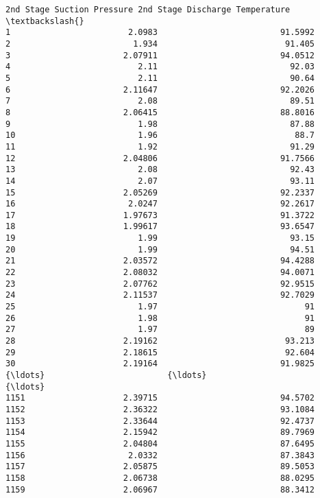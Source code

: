 \documentclass[11pt]{article}
\begin{document}
\begin{tcolorbox}[breakable, size=fbox, boxrule=.5pt, pad at break*=1mm, opacityfill=0]
\begin{Verbatim}[commandchars=\\\{\}]
     2nd Stage Suction Pressure 2nd Stage Discharge Temperature  \textbackslash{}
1                        2.0983                         91.5992
2                         1.934                          91.405
3                       2.07911                         94.0512
4                          2.11                           92.03
5                          2.11                           90.64
6                       2.11647                         92.2026
7                          2.08                           89.51
8                       2.06415                         88.8016
9                          1.98                           87.88
10                         1.96                            88.7
11                         1.92                           91.29
12                      2.04806                         91.7566
13                         2.08                           92.43
14                         2.07                           93.11
15                      2.05269                         92.2337
16                       2.0247                         92.2617
17                      1.97673                         91.3722
18                      1.99617                         93.6547
19                         1.99                           93.15
20                         1.99                           94.51
21                      2.03572                         94.4288
22                      2.08032                         94.0071
23                      2.07762                         92.9515
24                      2.11537                         92.7029
25                         1.97                              91
26                         1.98                              91
27                         1.97                              89
28                      2.19162                          93.213
29                      2.18615                          92.604
30                      2.19164                         91.9825
{\ldots}                         {\ldots}                             {\ldots}
1151                    2.39715                         94.5702
1152                    2.36322                         93.1084
1153                    2.33644                         92.4737
1154                    2.15942                         89.7969
1155                    2.04804                         87.6495
1156                     2.0332                         87.3843
1157                    2.05875                         89.5053
1158                    2.06738                         88.0295
1159                    2.06967                         88.3412

\end{Verbatim}
\end{tcolorbox}
\end{document}
